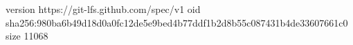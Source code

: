 version https://git-lfs.github.com/spec/v1
oid sha256:980ba6b49d18d0a0fc12de5e9bed4b77ddf1b2d8b55c087431b4de33607661c0
size 11068
